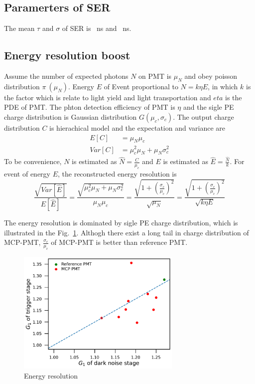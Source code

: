 \subsection{Paramerters of SER}
The mean $\tau$ and $\sigma$ of SER is \SI{}{ns} and \SI{}{ns}.
\subsection{Energy resolution boost}

Assume the number of expected photons $N$ on PMT is $\mu_N$ and obey poisson distribution $\pi~(\mu_N)$. Energy $E$ of Event proportional to $N=k\eta E$, in which $k$ is the factor which is relate to light yield and light transportation and $eta$ is the PDE of PMT. The phton detection efficiency of PMT is $\eta$ and the sigle PE charge distribution is Gaussian distribution $G(\mu_c,\sigma_c)$. The output charge distribution $C$ is hierachical model and the expectation and variance are
\begin{align}
    E[C]&=\mu_N\mu_c\\
    Var[C]&=\mu_c^2\mu_N+\mu_N\sigma_c^2
\end{align}
To be convenience, $N$ is estimated as $\hat{N}=\frac{C}{\mu_c}$ and $E$ is estimated as $\hat{E}=\frac{\hat{N}}{k}$. For event of energy $E$, the reconstructed energy resolution is 
\begin{equation}
    \frac{\sqrt{Var[\hat{E}]}}{E[\hat{E}]}=\frac{\sqrt{\mu_c^2\mu_N+\mu_N\sigma_c^2}}{\mu_N\mu_c}=\frac{\sqrt{1+(\frac{\sigma_c}{\mu_c})^2}}{\sqrt{\mu_N}}=\frac{\sqrt{1+(\frac{\sigma_c}{\mu_c})^2}}{\sqrt{k\eta E}}
\end{equation}

The energy resolution is dominated by sigle PE charge distribution, which is illustrated in the Fig.~\ref{fig:EnergyResolution}. Althogh there exist a long tail in charge distribution of MCP-PMT, $\frac{\sigma_c}{\mu_c}$ of MCP-PMT is better than reference PMT.
\begin{figure}[!htbp]
    \centering
    \includegraphics[width=0.7\textwidth,page=15]{figures/result/compare.pdf}
    \caption{Energy resolution}
    \label{fig:EnergyResolution}
\end{figure}
